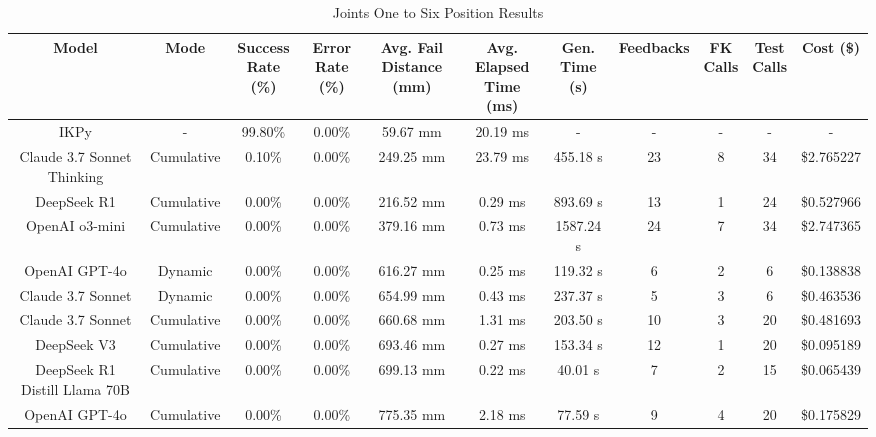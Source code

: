\begin{landscape}
\begin{table}[H]
\tiny
\renewcommand{\arraystretch}{1.2}
\caption{Joints One to Six Position Results}
\begin{center}
\begin{tabular}{|c|c|c|c|c|c|c|c|c|c|c|}
    \hline
    \textbf{Model} & 
    \textbf{Mode} & 
    \makecell{\textbf{Success}\\\textbf{Rate (\%)}} &
    \makecell{\textbf{Error}\\\textbf{Rate (\%)}} &
    \makecell{\textbf{Avg. Fail}\\\textbf{Distance (mm)}} &
    \makecell{\textbf{Avg. Elapsed}\\\textbf{Time (ms)}} &
    \makecell{\textbf{Gen.}\\\textbf{Time (s)}} &
    \textbf{Feedbacks} &
    \makecell{\textbf{FK}\\\textbf{Calls}} &
    \makecell{\textbf{Test}\\\textbf{Calls}} &
    \textbf{Cost (\$)} \\
    \hline
    IKPy & - & 99.80\% & 0.00\% & 59.67 mm & 20.19 ms & - & - & - & - & - \\
    \hline
    Claude 3.7 Sonnet Thinking & Cumulative & 0.10\% & 0.00\% & 249.25 mm & 23.79 ms & 455.18 s & 23 & 8 & 34 & \$2.765227 \\
    \hline
    DeepSeek R1 & Cumulative & 0.00\% & 0.00\% & 216.52 mm & 0.29 ms & 893.69 s & 13 & 1 & 24 & \$0.527966 \\
    \hline
    OpenAI o3-mini & Cumulative & 0.00\% & 0.00\% & 379.16 mm & 0.73 ms & 1587.24 s & 24 & 7 & 34 & \$2.747365 \\
    \hline
    OpenAI GPT-4o & Dynamic & 0.00\% & 0.00\% & 616.27 mm & 0.25 ms & 119.32 s & 6 & 2 & 6 & \$0.138838 \\
    \hline
    Claude 3.7 Sonnet & Dynamic & 0.00\% & 0.00\% & 654.99 mm & 0.43 ms & 237.37 s & 5 & 3 & 6 & \$0.463536 \\
    \hline
    Claude 3.7 Sonnet & Cumulative & 0.00\% & 0.00\% & 660.68 mm & 1.31 ms & 203.50 s & 10 & 3 & 20 & \$0.481693 \\
    \hline
    DeepSeek V3 & Cumulative & 0.00\% & 0.00\% & 693.46 mm & 0.27 ms & 153.34 s & 12 & 1 & 20 & \$0.095189 \\
    \hline
    DeepSeek R1 Distill Llama 70B & Cumulative & 0.00\% & 0.00\% & 699.13 mm & 0.22 ms & 40.01 s & 7 & 2 & 15 & \$0.065439 \\
    \hline
    OpenAI GPT-4o & Cumulative & 0.00\% & 0.00\% & 775.35 mm & 2.18 ms & 77.59 s & 9 & 4 & 20 & \$0.175829 \\

\end{tabular}
\end{center}
\end{table}
\end{landscape}
